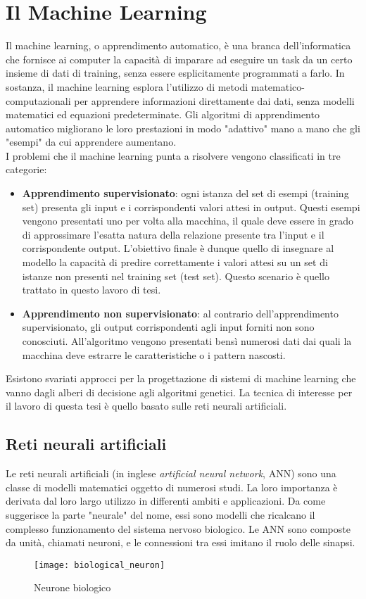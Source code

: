 \section{Il Machine Learning}
Il machine learning, o apprendimento automatico, è una branca dell'informatica che fornisce ai computer la capacità di imparare ad eseguire un task da un certo insieme di dati di training, senza essere esplicitamente programmati a farlo. In sostanza, il machine learning esplora l'utilizzo di metodi matematico-computazionali per apprendere informazioni direttamente dai dati, senza modelli matematici ed equazioni predeterminate. Gli algoritmi di apprendimento automatico migliorano le loro prestazioni in modo "adattivo" mano a mano che gli "esempi" da cui apprendere aumentano. \\
I problemi che il machine learning punta a risolvere vengono classificati in tre categorie:
\begin{itemize}
    \item \textbf{Apprendimento supervisionato}: ogni istanza del set di esempi (training set) presenta gli input e i corrispondenti valori attesi in output. Questi esempi vengono presentati uno per volta alla macchina, il quale deve essere in grado di approssimare l'esatta natura della relazione presente tra l'input e il corrispondente output. L’obiettivo finale è dunque quello di insegnare al modello la capacità di predire correttamente i valori attesi su un set di istanze non presenti nel training set (test set). Questo scenario è quello trattato in questo lavoro di tesi.
    \item \textbf{Apprendimento non supervisionato}: al contrario dell'apprendimento supervisionato, gli output corrispondenti agli input forniti non sono conosciuti. All'algoritmo vengono presentati bensì numerosi dati dai quali la macchina deve estrarre le caratteristiche o i pattern nascosti. 
\end{itemize}
Esistono svariati approcci per la progettazione di sistemi di machine learning che vanno dagli alberi di decisione agli algoritmi genetici. La tecnica di interesse per il lavoro di questa tesi è quello basato sulle reti neurali artificiali.

\subsection{Reti neurali artificiali}
Le reti neurali artificiali (in inglese \textit{artificial neural network}, ANN) sono una classe di modelli matematici oggetto di numerosi studi. La loro importanza è derivata dal loro largo utilizzo in differenti ambiti e applicazioni. Da come suggerisce la parte "neurale" del nome, essi sono modelli che ricalcano il complesso funzionamento del sistema nervoso biologico. Le ANN sono composte da unità, chiamati neuroni, e le connessioni tra essi imitano il ruolo delle sinapsi.
\begin{figure}[ht]
    \centering
    \texttt{[image: biological\_neuron]}
    \caption[Neurone biologico]{Neurone biologico \cite{maelfabien}}
\end{figure}
